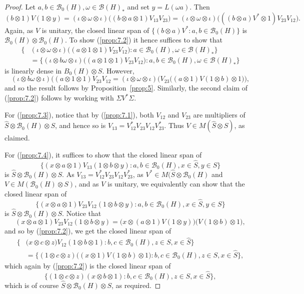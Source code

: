 \documentclass[a4paper,12pt]{article}
\theoremstyle{plain}
\theoremstyle{definition}
\newcommand{\mc}{\mathcal}
\begin{document}
\begin{proof}
Let $a,b\in\mc B_0(H), \omega\in\mc B(H)_*$ and set $y=L(\omega a)$.  Then
\[ (b\otimes 1)V(1\otimes y) = (\iota\otimes\omega\otimes\iota)\big(
(b\otimes a\otimes 1)V_{13} V_{23} \big)
= (\iota\otimes\omega\otimes\iota)\big( ((b\otimes a)V^* \otimes 1)
V_{23} V_{12} \big). \]
Again, as $V$ is unitary, the closed linear span of $\{ (b\otimes a)V^*:
a,b\in\mc B_0(H) \}$ is $\mc B_0(H)\otimes\mc B_0(H)$.  To show
(\ref{prop:7.2}) it hence suffices to show that
\begin{align*}
\big\{ & (\iota\otimes\omega\otimes\iota)\big( (a\otimes 1\otimes 1)
V_{23} V_{12} \big) : a\in\mc B_0(H), \omega\in\mc B(H)_* \} \\
&= \big\{ (\iota\otimes b\omega\otimes\iota)\big( (a\otimes 1\otimes 1)
V_{23} V_{12} \big) : a,b\in\mc B_0(H), \omega\in\mc B(H)_* \}
\end{align*}
is linearly dense in $B_0(H)\otimes S$.  However,
\[ (\iota\otimes b\omega\otimes\iota)\big( (a\otimes 1\otimes 1) V_{23} V_{12}
= (\iota\otimes\omega\otimes\iota)\big( V_{23} \big( (a\otimes 1)V(1\otimes b)
\otimes 1 \big) \big), \]
and so the result follows by Proposition~\ref{prop:5}.  Similarly, the
second claim of (\ref{prop:7.2}) follows by working with $\Sigma V^*\Sigma$.

For (\ref{prop:7.3}), notice that by (\ref{prop:7.1}), both $V_{12}$ and
$V_{23}$ are multipliers of $\hat S \otimes \mc B_0(H) \otimes S$, and hence so
is $V_{13} = V_{12}^* V_{23} V_{12} V_{23}^*$.  Thus $V\in M(\hat S\otimes S)$,
as claimed.

For (\ref{prop:7.4}), it suffices to show that the closed linear span of
\[ \big\{ (x\otimes a\otimes 1)V_{13}(1\otimes b\otimes y) :
a,b\in\mc B_0(H), x\in\hat S, y\in S \big\} \]
is $\hat S\otimes\mc B_0(H)\otimes S$.  As $V_{13} = V_{12}^* V_{23} V_{12}
V_{23}^*$, as $V^*\in M(\hat S\otimes\mc B_0(H)$ and $V\in M(\mc B_0(H)
\otimes S)$, and as $V$ is unitary, we equivalently can show that the closed
linear span of
\[ \big\{ (x\otimes a\otimes 1)V_{23}V_{12}(1\otimes b\otimes y) :
a,b\in\mc B_0(H), x\in\hat S, y\in S \big\} \]
is $\hat S\otimes\mc B_0(H)\otimes S$.  Notice that
\[ (x\otimes a\otimes 1)V_{23}V_{12}(1\otimes b\otimes y)
= \big( x \otimes (a\otimes 1)V(1\otimes y) \big)
\big( V(1\otimes b) \otimes 1 \big), \]
and so by (\ref{prop:7.2}), we get the closed linear span of
\begin{align*}
\big\{ & \big( x \otimes c\otimes z \big) V_{12}(1\otimes b\otimes 1)
: b,c\in\mc B_0(H), z\in S, x\in\hat S \big\} \\
&= \big\{ (1\otimes c\otimes z) \big( (x\otimes 1)V(1\otimes b) \otimes 1 \big)
: b,c\in\mc B_0(H), z\in S, x\in\hat S \big\},
\end{align*}
which again by (\ref{prop:7.2}) is the closed linear span of
\[ \big\{ (1\otimes c\otimes z) ( x \otimes b \otimes 1)
: b,c\in\mc B_0(H), z\in S, x\in\hat S \big\}, \]
which is of course $\hat S \otimes \mc B_0(H) \otimes S$, as required.
\end{proof}
\end{document}
